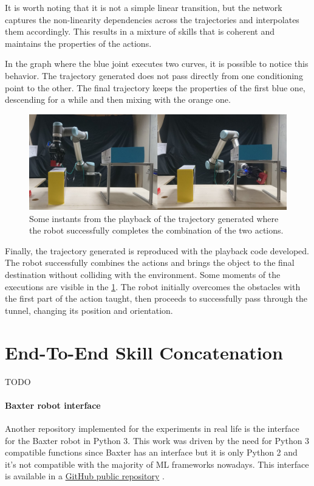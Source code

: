 It is worth noting that it is not a simple linear transition, but the network captures the non-linearity dependencies across the trajectories and interpolates them accordingly. This results in a mixture of skills that is coherent and maintains the properties of the actions. 

In the graph where the blue joint executes two curves, it is possible to notice this behavior. The trajectory generated does not pass directly from one conditioning point to the other. The final trajectory keeps the properties of the first blue one, descending for a while and then mixing with the orange one. 

\begin{figure}
    \centering
    \includegraphics[width=0.9\linewidth]{Images/6Dresult.jpg}
    \caption{ Some instants from the playback of the trajectory generated where the robot successfully completes the combination of the two actions. }
    \label{fig:6Dresult}
\end{figure}

Finally, the trajectory generated is reproduced with the playback code developed. The robot successfully combines the actions and brings the object to the final destination without colliding with the environment. Some moments of the executions are visible in the \cref{fig:6Dresult}. The robot initially overcomes the obstacles with the first part of the action taught, then proceeds to successfully pass through the tunnel, changing its position and orientation.


\newpage
\section{End-To-End Skill Concatenation}

TODO

\paragraph{Baxter robot interface} Another repository implemented for the experiments in real life is the interface for the Baxter robot in Python 3. This work was driven by the need for Python 3 compatible functions since Baxter has an interface but it is only Python 2 and it's not compatible with the majority of ML frameworks nowadays. This interface is available in a \href{https://github.com/igor-lirussi/baxter-python3}{GitHub public repository} \cite{url:Baxterrepo}. 

